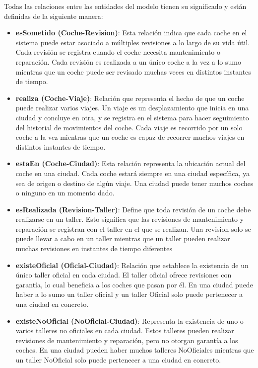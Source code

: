 \documentclass[12pt.a4paper]{article}
\begin{document}
Todas las relaciones entre las entidades del modelo tienen su significado y están definidas de la siguiente manera:
\begin{itemize}
\item \textbf{esSometido (Coche-Revision)}:  Esta relación indica que cada coche en el sistema puede estar asociado a múltiples revisiones a lo largo de su vida útil. Cada revisión se registra cuando el coche necesita mantenimiento o reparación. Cada revisión es realizada a un único coche a la vez a lo sumo mientras que un coche puede ser revisado muchas veces en distintos instantes de tiempo.
  
\item \textbf{realiza (Coche-Viaje)}: Relación que representa el hecho de que un coche puede realizar varios viajes. Un viaje es un desplazamiento que inicia en una ciudad y concluye en otra, y se registra en el sistema para hacer seguimiento del historial de movimientos del coche. Cada viaje es recorrido por un solo coche a la vez mientras que un coche es capaz de recorrer muchos viajes en distintos instantes de tiempo.

\item \textbf{estaEn (Coche-Ciudad)}: Esta relación representa la ubicación actual del coche en una ciudad. Cada coche estará siempre en una ciudad específica, ya sea de origen o destino de algún viaje. Una ciudad puede tener muchos coches o ninguno en un momento dado.

\item \textbf{esRealizada (Revision-Taller)}: Define que toda revisión de un coche debe realizarse en un taller. Esto significa que las revisiones de mantenimiento y reparación se registran con el taller en el que se realizan. Una revision solo se puede llevar a cabo en un taller mientras que un taller pueden realizar muchas revisiones en instantes de tiempo diferentes

\item \textbf{existeOficial (Oficial-Ciudad)}: Relación que establece la existencia de un único taller oficial en cada ciudad. El taller oficial ofrece revisiones con garantía, lo cual beneficia a los coches que pasan por él. En una ciudad puede haber a lo sumo un taller oficial y un taller Oficial solo puede pertenecer a una ciudad en concreto.


\item \textbf{existeNoOficial (NoOficial-Ciudad)}: Representa la existencia de uno o varios talleres no oficiales en cada ciudad. Estos talleres pueden realizar revisiones de mantenimiento y reparación, pero no otorgan garantía a los coches. En una ciudad pueden haber muchos talleres NoOficiales mientras que un taller NoOficial solo puede pertenecer a una ciudad en concreto.


\end{itemize}
\end{document}
